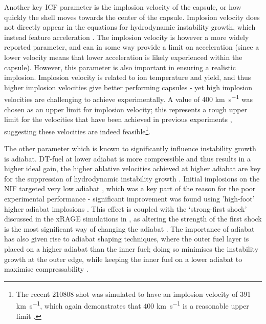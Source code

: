 Another key ICF parameter is the implosion velocity of the capsule, or how quickly the shell moves towards the center of the capsule. Implosion velocity does not directly appear in the equations for hydrodynamic instability growth, which instead feature acceleration \cite{Atzeni2008}. The implosion velocity is however a more widely reported parameter, and can in some way provide a limit on acceleration (since a lower velocity means that lower acceleration is likely experienced within the capsule). However, this parameter is also important in ensuring a realistic implosion. Implosion velocity is related to ion temperature and yield, and thus higher implosion velocities give better performing capsules - yet high implosion velocities are challenging to achieve experimentally. A value of 400 \unit{\kilo\meter\per\second} was chosen as an upper limit for implosion velocity; this represents a rough upper limit for the velocities that have been achieved in previous experiments \cite{Craxton2015, Callahan2015}, suggesting these velocities are indeed feasible\footnote{The recent 210808 shot was simulated to have an implosion velocity of 391 \unit{\kilo\meter\per\second}, which again demonstrates that 400 \unit{\kilo\meter\per\second} is a reasonable upper limit \cite{Kritcher2022}.}.

The other parameter which is known to significantly influence instability growth is adiabat. DT-fuel at lower adiabat is more compressible and thus results in a higher ideal gain, the higher ablative velocities achieved at higher adiabat are key for the suppression of hydrodynamic instability growth \cite{Betti2016}. Initial implosions on the NIF targeted very low adiabat \cite{Lindl2014}, which was a key part of the reason for the poor experimental performance - significant improvement was found using 'high-foot' higher adiabat implosions \cite{Hurricane2014}. This effect is coupled with the `strong-first shock' discussed in the xRAGE simulations in \cite{Haines2017a}, as altering the strength of the first shock is the most significant way of changing the adiabat \cite{Robey2013,Haines2017a,Haines2019a}. The importance of adiabat has also given rise to adiabat shaping techniques, where the outer fuel layer is placed on a higher adiabat than the inner fuel; doing so minimises the instability growth at the outer edge, while keeping the inner fuel on a lower adiabat to maximise compressability \cite{Goncharov2003}.

